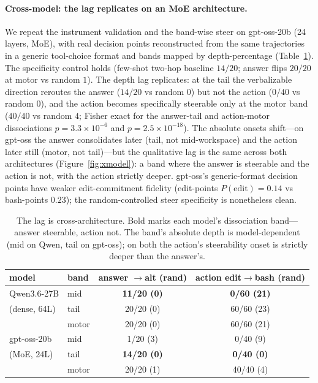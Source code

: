 \documentclass[11pt]{article}
\begin{document}
\paragraph{Cross-model: the lag replicates on an MoE architecture.}
We repeat the instrument validation and the band-wise steer on gpt-oss-20b (24 layers, MoE), with
real decision points reconstructed from the same trajectories in a generic tool-choice format and
bands mapped by depth-percentage (Table~\ref{tab:xmodel}). The specificity control holds (few-shot
two-hop baseline $14/20$; answer flips $20/20$ at motor vs random $1$). The depth lag replicates: at
the tail the verbalizable direction reroutes the answer ($14/20$ vs random $0$) but not the action
($0/40$ vs random $0$), and the action becomes specifically steerable only at the motor band ($40/40$
vs random $4$; Fisher exact for the answer-tail and action-motor dissociations $p{=}3.3\times10^{-6}$
and $p{=}2.5\times10^{-18}$). The absolute onsets shift---on gpt-oss the answer consolidates later (tail, not
mid-workspace) and the action later still (motor, not tail)---but the qualitative lag is the same
across both architectures (Figure~\ref{fig:xmodel}): a band where the answer is steerable and the
action is not, with the action strictly deeper. gpt-oss's
generic-format decision points have weaker edit-commitment fidelity (edit-points $P(\text{edit}){=}0.14$
vs bash-points $0.23$); the random-controlled steer specificity is nonetheless clean.

\begin{table}[h]\centering\small
\begin{tabular}{llcc}
\toprule
model & band & answer $\rightarrow$alt (rand) & action edit$\rightarrow$bash (rand) \\
\midrule
Qwen3.6-27B    & mid   & \textbf{11/20 (0)} & \textbf{0/60 (21)} \\
(dense, 64L)   & tail  & 20/20 (0) & 60/60 (23) \\
               & motor & 20/20 (0) & 60/60 (21) \\
\midrule
gpt-oss-20b    & mid   & 1/20 (3)  & 0/40 (9) \\
(MoE, 24L)     & tail  & \textbf{14/20 (0)} & \textbf{0/40 (0)} \\
               & motor & 20/20 (1) & 40/40 (4) \\
\bottomrule
\end{tabular}
\caption{The lag is cross-architecture. Bold marks each model's dissociation band---answer steerable,
action not. The band's absolute depth is model-dependent (mid on Qwen, tail on gpt-oss); on both the
action's steerability onset is strictly deeper than the answer's.}
\label{tab:xmodel}
\end{table}
\end{document}
